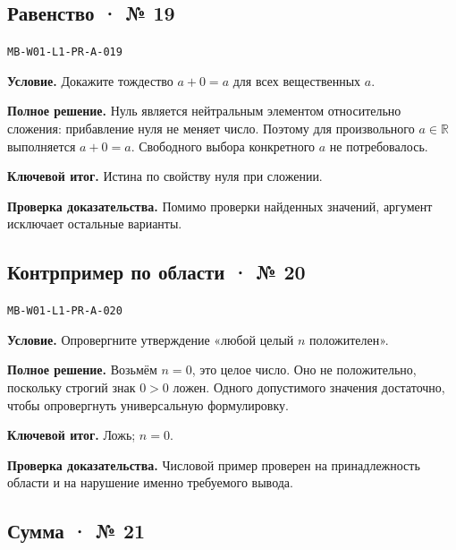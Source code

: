 \documentclass[11pt,a4paper,openany]{book}
\newcommand{\muid}[1]{\texttt{\footnotesize #1}}
\begin{document}
\subsection*{Равенство · № 19}\hypertarget{solution:MB-W01-L1-PR-A-019}{}

\muid{MB-W01-L1-PR-A-019}\par

\textbf{Условие.} Докажите тождество $a+0=a$ для всех вещественных $a$.\par

\textbf{Полное решение.} Нуль является нейтральным элементом относительно сложения: прибавление нуля не меняет число. Поэтому для произвольного $a\in\mathbb R$ выполняется $a+0=a$. Свободного выбора конкретного $a$ не потребовалось.


\begin{learnbox}\textbf{Ключевой итог.} Истина по свойству нуля при сложении.\par \textbf{Проверка доказательства.} 
Помимо проверки найденных значений, аргумент исключает остальные варианты. 
\end{learnbox}

\subsection*{Контрпример по области · № 20}\hypertarget{solution:MB-W01-L1-PR-A-020}{}

\muid{MB-W01-L1-PR-A-020}\par

\textbf{Условие.} Опровергните утверждение «любой целый $n$ положителен».\par

\textbf{Полное решение.} Возьмём $n=0$, это целое число. Оно не положительно, поскольку строгий знак $0>0$ ложен. Одного допустимого значения достаточно, чтобы опровергнуть универсальную формулировку.


\begin{learnbox}\textbf{Ключевой итог.} Ложь; $n=0$.\par \textbf{Проверка доказательства.} 
Числовой пример проверен на принадлежность области и на нарушение именно требуемого вывода. 
\end{learnbox}

\subsection*{Сумма · № 21}\hypertarget{solution:MB-W01-L1-PR-A-021}{}
\end{document}

